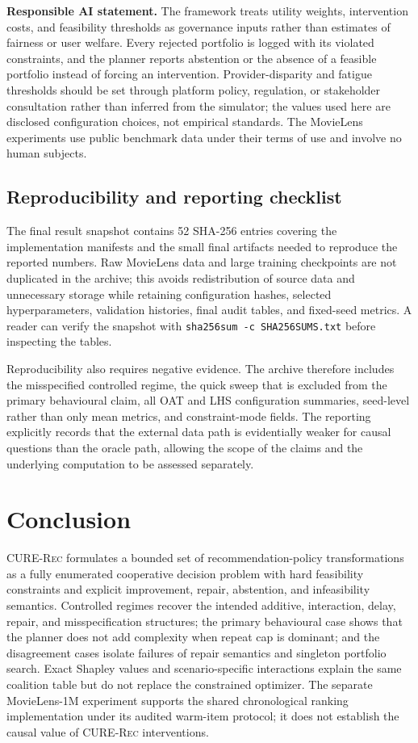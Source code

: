 \documentclass[review]{elsarticle}
\theoremstyle{plain}
\theoremstyle{definition}
\theoremstyle{remark}
\newcommand{\CURE}{\textsc{CURE-Rec}}
\begin{document}
\textbf{Responsible AI statement.} The framework treats utility weights, intervention costs, and feasibility thresholds as governance inputs rather than estimates of fairness or user welfare. Every rejected portfolio is logged with its violated constraints, and the planner reports abstention or the absence of a feasible portfolio instead of forcing an intervention. Provider-disparity and fatigue thresholds should be set through platform policy, regulation, or stakeholder consultation rather than inferred from the simulator; the values used here are disclosed configuration choices, not empirical standards. The MovieLens experiments use public benchmark data under their terms of use and involve no human subjects.

\subsection{Reproducibility and reporting checklist}

The final result snapshot contains 52 SHA-256 entries covering the implementation manifests and the small final artifacts needed to reproduce the reported numbers. Raw MovieLens data and large training checkpoints are not duplicated in the archive; this avoids redistribution of source data and unnecessary storage while retaining configuration hashes, selected hyperparameters, validation histories, final audit tables, and fixed-seed metrics. A reader can verify the snapshot with \texttt{sha256sum -c SHA256SUMS.txt} before inspecting the tables.

Reproducibility also requires negative evidence. The archive therefore includes the misspecified controlled regime, the quick sweep that is excluded from the primary behavioural claim, all OAT and LHS configuration summaries, seed-level rather than only mean metrics, and constraint-mode fields. The reporting explicitly records that the external data path is evidentially weaker for causal questions than the oracle path, allowing the scope of the claims and the underlying computation to be assessed separately.

\section{Conclusion}\label{sec:conclusion}

\CURE{} formulates a bounded set of recommendation-policy transformations as a fully enumerated cooperative decision problem with hard feasibility constraints and explicit improvement, repair, abstention, and infeasibility semantics. Controlled regimes recover the intended additive, interaction, delay, repair, and misspecification structures; the primary behavioural case shows that the planner does not add complexity when repeat cap is dominant; and the disagreement cases isolate failures of repair semantics and singleton portfolio search. Exact Shapley values and scenario-specific interactions explain the same coalition table but do not replace the constrained optimizer. The separate MovieLens-1M experiment supports the shared chronological ranking implementation under its audited warm-item protocol; it does not establish the causal value of \CURE{} interventions.
\end{document}
